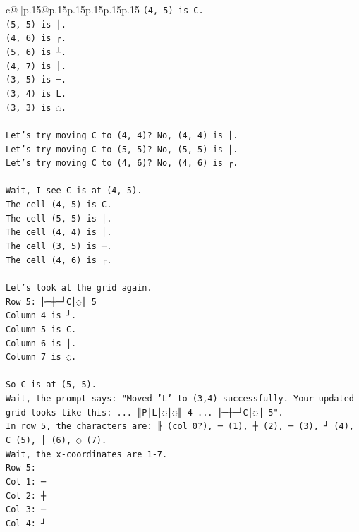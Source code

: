 \documentclass{article}
\begin{document}
{\begin{supertabular}{c@{$\;$}|p{.15\linewidth}@{}p{.15\linewidth}p{.15\linewidth}p{.15\linewidth}p{.15\linewidth}p{.15\linewidth}}
{{{\texttt{(4, 5) is C.} \\
\texttt{(5, 5) is │.} \\
\texttt{(4, 6) is ┌.} \\
\texttt{(5, 6) is ┴.} \\
\texttt{(4, 7) is │.} \\
\texttt{(3, 5) is ─.} \\
\texttt{(3, 4) is L.} \\
\texttt{(3, 3) is ◌.} \\
\\ 
\texttt{Let's try moving C to (4, 4)? No, (4, 4) is │.} \\
\texttt{Let's try moving C to (5, 5)? No, (5, 5) is │.} \\
\texttt{Let's try moving C to (4, 6)? No, (4, 6) is ┌.} \\
\\ 
\texttt{Wait, I see C is at (4, 5).} \\
\texttt{The cell (4, 5) is C.} \\
\texttt{The cell (5, 5) is │.} \\
\texttt{The cell (4, 4) is │.} \\
\texttt{The cell (3, 5) is ─.} \\
\texttt{The cell (4, 6) is ┌.} \\
\\ 
\texttt{Let's look at the grid again.} \\
\texttt{Row 5: ╟─┼─┘C│◌║ 5} \\
\texttt{Column 4 is ┘.} \\
\texttt{Column 5 is C.} \\
\texttt{Column 6 is │.} \\
\texttt{Column 7 is ◌.} \\
\\ 
\texttt{So C is at (5, 5).} \\
\texttt{Wait, the prompt says: "Moved 'L' to (3,4) successfully. Your updated grid looks like this: ... ║P│L│◌│◌║ 4 ... ╟─┼─┘C│◌║ 5".} \\
\texttt{In row 5, the characters are: ╟ (col 0?), ─ (1), ┼ (2), ─ (3), ┘ (4), C (5), │ (6), ◌ (7).} \\
\texttt{Wait, the x{-}coordinates are 1{-}7.} \\
\texttt{Row 5:} \\
\texttt{Col 1: ─} \\
\texttt{Col 2: ┼} \\
\texttt{Col 3: ─} \\
\texttt{Col 4: ┘} \\
}}}
\end{supertabular}}
\end{document}
